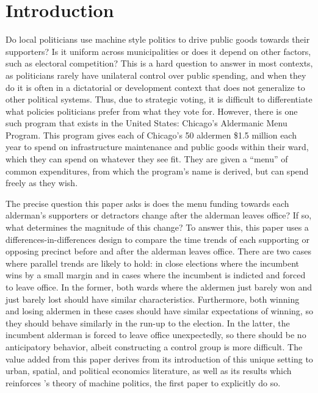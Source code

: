 \section{Introduction}\label{sec:Introduction}

Do local politicians use machine style politics to drive public goods towards their supporters?
Is it uniform across municipalities or does it depend on other factors, such as electoral competition?
This is a hard question to answer in most contexts, as politicians rarely have unilateral control over public spending, and when they do it is often in a dictatorial or development context that does not generalize to other political systems.
Thus, due to strategic voting, it is difficult to differentiate what policies politicians prefer from what they vote for.
However, there is one such program that exists in the United States: Chicago's Aldermanic Menu Program.
This program gives each of Chicago's 50 aldermen \$1.5 million each year to spend on infrastructure maintenance and public goods within their ward, which they can spend on whatever they see fit.
They are given a ``menu'' of common expenditures, from which the program's name is derived, but can spend freely as they wish.

The precise question this paper asks is does the menu funding towards each alderman's supporters or detractors change after the alderman leaves office?
If so, what determines the magnitude of this change? 
To answer this, this paper uses a differences-in-differences design to compare the time trends of each supporting or opposing precinct before and after the alderman leaves office.
There are two cases where parallel trends are likely to hold: in close elections where the incumbent wins by a small margin and in cases where the incumbent is indicted and forced to leave office.
In the former, both wards where the aldermen just barely won and just barely lost should have similar characteristics.
Furthermore, both winning and losing aldermen in these cases should have similar expectations of winning, so they should behave similarly in the run-up to the election.
In the latter, the incumbent alderman is forced to leave office unexpectedly, so there should be no anticipatory behavior, albeit constructing a control group is more difficult.
The value added from this paper derives from its introduction of this unique setting to urban, spatial, and political economics literature, as well as its results which reinforces \cite{dixit_londregan1996}'s theory of machine politics, the first paper to explicitly do so.


